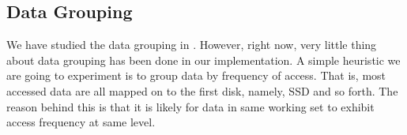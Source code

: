 \subsection{Data Grouping}

We have studied the data grouping in \cite{Wildani_grouping}. However,
right now, very little thing about data grouping has been done in our
implementation. A simple heuristic we are going to experiment is to
group data by frequency of access. That is, most accessed data are all
mapped on to the first disk, namely, SSD and so forth. The reason
behind this is that it is likely for data in same working set to
exhibit access frequency at same level. 

